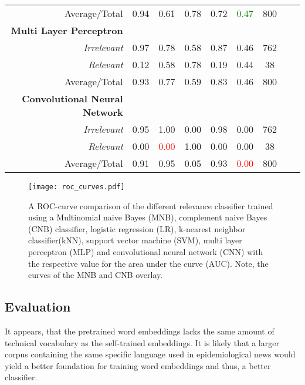 \begin{table}
\begin{tabular}{@{}rcccccccc@{}}
    Average/Total& 0.94& 0.61& 0.78& 0.72& \textcolor{green}{0.47}& 800 \vspace{2mm}\\
    \textbf{Multi Layer Perceptron}\\
    \emph{Irrelevant}& 0.97& 0.78&  0.58& 0.87& 0.46& 762 \\
    \emph{Relevant}& 0.12& 0.58&  0.78& 0.19& 0.44& 38 \\
    Average/Total& 0.93& 0.77& 0.59& 0.83& 0.46& 800 \\
    \textbf{Convolutional Neural Network}\\
    \emph{Irrelevant}& 0.95& 1.00&  0.00& 0.98& 0.00& 762 \\
    \emph{Relevant}& 0.00& \textcolor{red}{0.00}&  1.00& 0.00& 0.00& 38 \\
    Average/Total& 0.91& 0.95& 0.05& 0.93& \textcolor{red}{0.00}& 800 \\
    \bottomrule
  \end{tabular}
\label{table:recommender_performance}
\end{table}

\begin{figure}
  \centering
  \texttt{[image: roc\_curves.pdf]}
  \caption{A ROC-curve comparison of the different relevance classifier trained using a Multinomial naive Bayes (MNB), complement naive Bayes (CNB) classifier, logistic regression (LR), k-nearest neighbor classifier(kNN), support vector machine (SVM), multi layer perceptron (MLP) and convolutional neural network (CNN) with the respective value for the area under the curve (AUC). Note, the curves of the MNB and CNB overlay.}
\label{fig:roc_key}
\end{figure}

\subsection{Evaluation}
  It appears, that the pretrained word embeddings lacks the same amount of technical vocabulary as the self-trained embeddings. It is likely that a larger corpus containing the same specific language used in epidemiological news would yield a better foundation for training word embeddings and thus, a better classifier.

